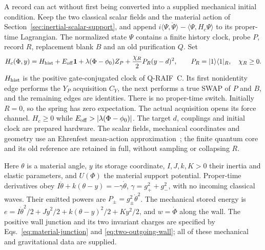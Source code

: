 A record can act without first being converted into a supplied mechanical
initial condition. Keep the two classical scalar fields and the material
action of Section~\ref{sec:inertial-scalar-support}, and append
$i\langle\Psi,\dot\Psi\rangle-\langle\Psi,H_c\Psi\rangle$ to its
proper-time Lagrangian. The normalized state $\Psi$ contains a finite
history clock, probe $P$, record $R$, replacement blank $B$ and an old
purification $Q$. Set
\begin{equation}\label{eq:record-spring-core}
 H_c(\Phi,y)=H_{\rm hist}+E_{\rm off}\mathbf1
       +\lambda(\Phi-\phi_0)Z_P
       +\frac{\chi_R}{2}P_R(y-d)^2,
 \qquad P_R=|1\rangle\langle1|_R,\quad\chi_R\ge0.
\end{equation}
$H_{\rm hist}$ is the positive gate-conjugated clock of Q-RAIF~C.
Its first nonidentity edge performs the $Y_P$ acquisition $C_Y$, the next performs a true
SWAP of $P$ and $B$, and the remaining edges are identities.
There is no proper-time switch. Initially $R=0$, so the spring has
zero expectation. The actual acquisition opens its force channel.
$H_c\ge0$ while $E_{\rm off}>|\lambda(\Phi-\phi_0)|$.
The target $d$, couplings and initial clock are prepared hardware.
The scalar fields, mechanical coordinates and geometry use an Ehrenfest
mean-action approximation~\cite[Section~2]{CastroGross2013};
the finite quantum core and its old reference are retained
in full, without sampling or collapsing $R$.

Here $\theta$ is a material angle, $y$ its storage coordinate,
$I,J,k,K>0$ their inertia and elastic parameters, and $U(\Phi)$
the material support potential. Proper-time derivatives obey
$I\ddot\theta+k(\theta-y)=-\gamma\dot\theta$,
$\gamma=g_+^2+g_-^2$, with no incoming classical waves.
Their emitted powers are $P_\pm=g_\pm^2\dot\theta^2$.
The mechanical stored energy is
$e=I\dot\theta^2/2+J\dot y^2/2+k(\theta-y)^2/2+Ky^2/2$,
and $w=\dot\Phi$ along the wall.
The positive wall junction and its two invariant charges are specified
by Eqs.~\eqref{eq:material-junction} and \eqref{eq:two-outgoing-wall};
all of these mechanical and gravitational data are supplied.

